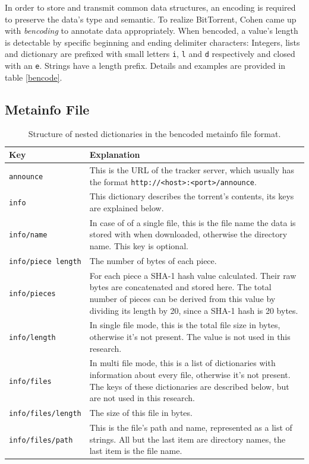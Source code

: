 \documentclass[10pt, a4paper, twoside=false, headsepline]{scrbook}
\renewcommand{\_}{\origunderscore\allowbreak}
\begin{document}
In order to store and transmit common data structures, an encoding is required to preserve the data's type and semantic. To realize BitTorrent, Cohen came up with \emph{bencoding} to annotate data appropriately. When bencoded, a value's length is detectable by specific beginning and ending delimiter characters: Integers, lists and dictionary are prefixed with small letters \texttt{i}, \texttt{l} and \texttt{d} respectively and closed with an \texttt{e}. Strings have a length prefix. Details and examples are provided in table \ref{bencode}.

\subsection{Metainfo File}
\begin{table}
\centering
\begin{tabularx}{\textwidth}{lX}
\toprule
Key & Explanation \\
\midrule
\texttt{announce} & This is the URL of the tracker server, which usually has the format \nolinkurl{http://<host>:<port>/announce}. \\
\texttt{info} & This dictionary describes the torrent's contents, its keys are explained below. \\
\texttt{info/name} & In case of of a single file, this is the file name the data is stored with when downloaded, otherwise the directory name. This key is optional. \\
\texttt{info/piece length} & The number of bytes of each piece. \\
\texttt{info/pieces} & For each piece a SHA-1 hash value calculated. Their raw bytes are concatenated and stored here. The total number of pieces can be derived from this value by dividing its length by 20, since a SHA-1 hash is 20 bytes. \\
\texttt{info/length} & In single file mode, this is the total file size in bytes, otherwise it's not present. The value is not used in this research. \\
\texttt{info/files} & In multi file mode, this is a list of dictionaries with information about every file, otherwise it's not present. The keys of these dictionaries are described below, but are not used in this research. \\
\texttt{info/files/length} & The size of this file in bytes. \\
\texttt{info/files/path} & This is the file's path and name, represented as a list of strings. All but the last item are directory names, the last item is the file name. \\
\bottomrule
\end{tabularx}
\caption[Structure of the metainfo file format]{Structure of nested dictionaries in the bencoded metainfo file format.}
\label{metainfo-file}
\end{table}
\end{document}
